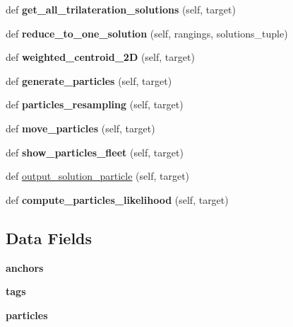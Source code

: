 \begin{DoxyCompactItemize}
def {\bfseries get\+\_\+all\+\_\+trilateration\+\_\+solutions} (self, target)
\item 
\mbox{\label{class_emulator_1_1_i_p_s_a6dd30902da61fe41228c7ac9a7816ef0}} 
def {\bfseries reduce\+\_\+to\+\_\+one\+\_\+solution} (self, rangings, solutions\+\_\+tuple)
\item 
\mbox{\label{class_emulator_1_1_i_p_s_ac21a81b6a17c68a6b16776b728485799}} 
def {\bfseries weighted\+\_\+centroid\+\_\+2D} (self, target)
\item 
\mbox{\label{class_emulator_1_1_i_p_s_a01d471347b3c790a15816763c580c149}} 
def {\bfseries generate\+\_\+particles} (self, target)
\item 
\mbox{\label{class_emulator_1_1_i_p_s_a02ab6a457d0d27c9c2b65f269c062def}} 
def {\bfseries particles\+\_\+resampling} (self, target)
\item 
\mbox{\label{class_emulator_1_1_i_p_s_a0857cdbfaacaa8ece56f2a4499c15f16}} 
def {\bfseries move\+\_\+particles} (self, target)
\item 
\mbox{\label{class_emulator_1_1_i_p_s_a996d6352894bc8fa1c7382cd5a63ce93}} 
def {\bfseries show\+\_\+particles\+\_\+fleet} (self, target)
\item 
def \mbox{\hyperlink{class_emulator_1_1_i_p_s_abe450fd9913862afeb368a8eff426c13}{output\+\_\+solution\+\_\+particle}} (self, target)
\item 
\mbox{\label{class_emulator_1_1_i_p_s_aaf03a6c5c06dc24505d18debe8d1910a}} 
def {\bfseries compute\+\_\+particles\+\_\+likelihood} (self, target)
\end{DoxyCompactItemize}
\subsection*{Data Fields}
\begin{DoxyCompactItemize}
\item 
\mbox{\label{class_emulator_1_1_i_p_s_aba54450ad49ad1b46e29721241611d50}} 
{\bfseries anchors}
\item 
\mbox{\label{class_emulator_1_1_i_p_s_a4ccc9b09cd5009aceaa248cf636be51d}} 
{\bfseries tags}
\item 
\mbox{\label{class_emulator_1_1_i_p_s_aeada64451c95b47fb098a2bac5a73660}} 
{\bfseries particles}
\end{DoxyCompactItemize}


